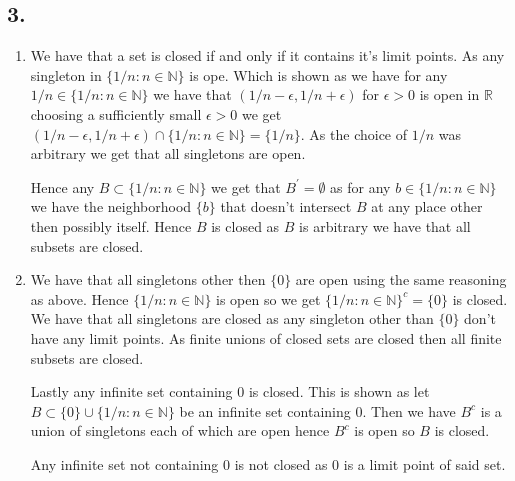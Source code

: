\documentclass{amsart}
\theoremstyle{plain}
\theoremstyle{definition}
\theoremstyle{remark}
\begin{document}
\subsection*{3.}
\begin{enumerate}[label=(\alph*)]
    \item {We have that a set is closed if and only if it contains it's limit points. As any singleton in $\{1/n: n\in \mathbb{N}\}$ is ope. Which is shown as we have for any $1/n\in \{1/n:n\in \mathbb{N}\}$ we have that $(1/n-\epsilon, 1/n+\epsilon)$ for $\epsilon >0$ is open in $\mathbb{R}$ choosing a sufficiently small $\epsilon>0$ we get $(1/n-\epsilon,1/n+\epsilon)\cap \{1/n:n\in \mathbb{N}\}=\{1/n\}$. As the choice of $1/n$ was arbitrary we get that all singletons are open.
    
    Hence any $B\subset \{1/n: n\in \mathbb N\}$ we get that $B^\prime=\emptyset$ as for any $b\in \{1/n:n\in \mathbb N\}$ we have the neighborhood $\{b\}$ that doesn't intersect $B$ at any place other then possibly itself. Hence $B$ is closed as $B$ is arbitrary we have that all subsets are closed. 
    }
    \item {We have that all singletons other then $\{0\}$ are open using the same reasoning as above. Hence $\{1/n: n\in \mathbb{N}\}$ is open so we get $\{1/n: n\in \mathbb{N}\}^c=\{0\}$ is closed. We have that all singletons are closed as any singleton other than $\{0\}$ don't have any limit points. As finite unions of closed sets are closed then all finite subsets are closed. 
    
    Lastly any infinite set containing $0$ is closed. This is shown as let $B\subset \{0\}\cup \{1/n:n\in \mathbb{N}\}$ be an infinite set containing $0$. Then we have $B^c$ is a union of singletons each of which are open hence $B^c$ is open so $B$ is closed. 
    
    Any infinite set not containing $0$ is not closed as $0$ is a limit point of said set. 
    }
\end{enumerate}
\end{document}
